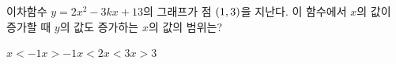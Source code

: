 \hspace*{2mm}\begin{minipage}[t]{\dimexpr\linewidth-2mm\relax}\vspace{0pt}
이차함수 $y=2x^2-3kx+13$의 그래프가 점 $(1{,}\mkern3mu 3)$을 지난다. 이 함수에서 $x$의 값이 증가할 때 $y$의 값도 증가하는 $x$의 값의 범위는? 
\begin{choices32}{$x<-1$}{$x>-1$}{$x<2$}{$x<3$}{$x>3$}\end{choices32}\end{minipage}
